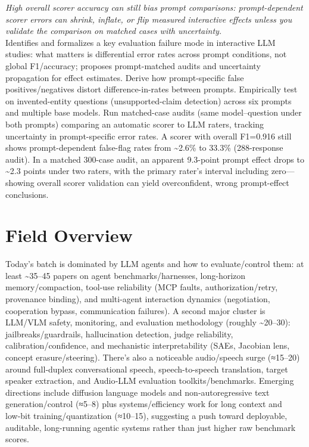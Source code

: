 \documentclass[12pt,letterpaper]{article}
\begin{document}
{\small\textit{High overall scorer accuracy can still bias prompt comparisons: prompt-dependent scorer errors can shrink, inflate, or flip measured interactive effects unless you validate the comparison on matched cases with uncertainty.}}\\[1pt]
{\footnotesize Identifies and formalizes a key evaluation failure mode in interactive LLM studies: what matters is differential error rates across prompt conditions, not global F1/accuracy; proposes prompt-matched audits and uncertainty propagation for effect estimates. Derive how prompt-specific false positives/negatives distort difference-in-rates between prompts. Empirically test on invented-entity questions (unsupported-claim detection) across six prompts and multiple base models. Run matched-case audits (same model--question under both prompts) comparing an automatic scorer to LLM raters, tracking uncertainty in prompt-specific error rates. A scorer with overall F1=0.916 still shows prompt-dependent false-flag rates from \textasciitilde{}2.6\% to 33.3\% (288-response audit). In a matched 300-case audit, an apparent 9.3-point prompt effect drops to \textasciitilde{}2.3 points under two raters, with the primary rater's interval including zero---showing overall scorer validation can yield overconfident, wrong prompt-effect conclusions.}

\medskip



\section*{Field Overview}
{\footnotesize Today's batch is dominated by LLM agents and how to evaluate/control them: at least \textasciitilde{}35--45 papers on agent benchmarks/harnesses, long-horizon memory/compaction, tool-use reliability (MCP faults, authorization/retry, provenance binding), and multi-agent interaction dynamics (negotiation, cooperation bypass, communication failures). A second major cluster is LLM/VLM safety, monitoring, and evaluation methodology (roughly \textasciitilde{}20--30): jailbreaks/guardrails, hallucination detection, judge reliability, calibration/confidence, and mechanistic interpretability (SAEs, Jacobian lens, concept erasure/steering). There's also a noticeable audio/speech surge (≈15--20) around full‑duplex conversational speech, speech-to-speech translation, target speaker extraction, and Audio‑LLM evaluation toolkits/benchmarks. Emerging directions include diffusion language models and non‑autoregressive text generation/control (≈5--8) plus systems/efficiency work for long context and low‑bit training/quantization (≈10--15), suggesting a push toward deployable, auditable, long-running agentic systems rather than just higher raw benchmark scores.}
\end{document}
